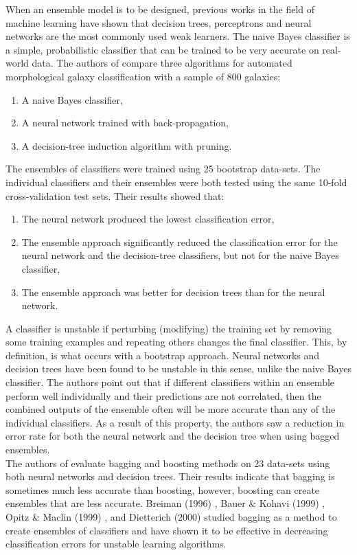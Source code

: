 \documentclass[paper=a4, fontsize=11pt]{scrartcl} %
\begin{document}
When an ensemble model is to be designed, previous works in the field of machine learning have shown that decision trees, perceptrons and neural networks are the most commonly used weak learners. 
The naive Bayes classifier is a simple, probabilistic classifier that can be trained to be very accurate on real-world data.
The authors of \cite{ensemble-lit1} compare three algorithms for automated morphological galaxy classification with a sample of 800 galaxies:
\begin{enumerate}
	\item A naive Bayes classifier, 
	\item A neural network trained with back-propagation, 
	\item A decision-tree induction algorithm with pruning. 
\end{enumerate} 
The ensembles of classifiers were trained using 25 bootstrap data-sets.
The individual classifiers and their ensembles were both tested using the same 10-fold cross-validation test sets.
Their results showed that:
\begin{enumerate}
	\item The neural network produced the lowest classification error, 
	\item The ensemble approach significantly reduced the classification error for the neural network and the decision-tree classifiers, but not for the naive Bayes classifier, 
	\item The ensemble approach was better for decision trees than for the neural network.
\end{enumerate} 
A classifier is unstable if perturbing (modifying) the training set by removing some training examples and repeating others changes the final classifier.
This, by definition, is what occurs with a bootstrap approach.
Neural networks and decision trees have been found to be unstable in this sense, unlike the naive Bayes classifier.
The authors point out that if different classifiers within an ensemble perform well individually and their predictions are not correlated, then the combined outputs of the ensemble often will be more accurate than any of the individual classifiers.
As a result of this property, the authors saw a reduction in error rate for both the neural network and the decision tree when using bagged ensembles.
\\

The authors of \cite{ensemble-lit2} evaluate bagging and boosting methods on 23 data-sets using both neural networks and decision trees.
Their results indicate that bagging is sometimes much less accurate than boosting, however, boosting can create ensembles that are less accurate.
Breiman (1996) \cite{ensemble-lit3}, Bauer \& Kohavi (1999) \cite{ensemble-lit4}, Opitz \& Maclin (1999) \cite{ensemble-lit5}, and Dietterich (2000) \cite{ensemble-lit6} studied bagging as a method to create ensembles of classifiers and have shown it to be effective in decreasing classification errors for unstable learning algorithms.
\\
\end{document}
